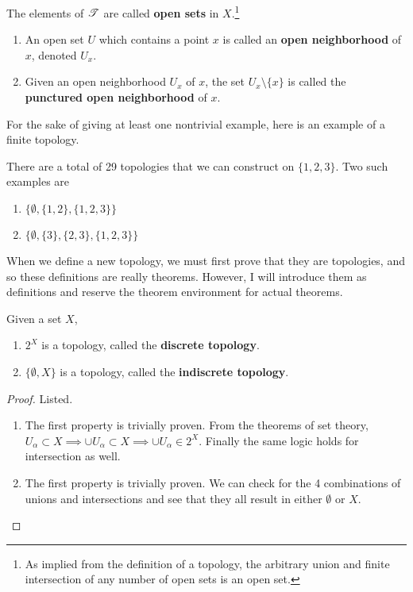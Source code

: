  \begin{definition}
    The elements of $\operatorname{\mathscr{T}}$ are called \textbf{open sets} in $X$.\footnote{As implied from the definition of a topology, the arbitrary union and finite intersection of any number of open sets is an open set.} 
    \begin{enumerate}
      \item An open set $U$ which contains a point $x$ is called an \textbf{open neighborhood} of $x$, denoted $U_x$. 
      \item Given an open neighborhood $U_x$ of $x$, the set $U_x \setminus \{x\}$ is called the \textbf{punctured open neighborhood} of $x$. 
    \end{enumerate}
  \end{definition}

  For the sake of giving at least one nontrivial example, here is an example of a finite topology. 

  \begin{example}
    There are a total of 29 topologies that we can construct on $\{1, 2, 3\}$. Two such examples are 
    \begin{enumerate}
      \item $\{\emptyset, \{1, 2\}, \{1, 2, 3\}\}$ 
      \item $\{\emptyset, \{3\}, \{2, 3\}, \{1, 2, 3\}\}$
    \end{enumerate}
  \end{example} 

  When we define a new topology, we must first prove that they are topologies, and so these definitions are really theorems. However, I will introduce them as definitions and reserve the theorem environment for actual theorems. 

  \begin{definition}
    Given a set $X$, 
    \begin{enumerate}
      \item $2^X$ is a topology, called the \textbf{discrete topology}. 
      \item $\{\emptyset, X \}$ is a topology, called the \textbf{indiscrete topology}. 
    \end{enumerate}
  \end{definition}
  \begin{proof}
    Listed. 
    \begin{enumerate}
      \item The first property is trivially proven. From the theorems of set theory, $U_\alpha \subset X \implies \cup U_\alpha \subset X \implies \cup U_\alpha \in 2^X$. Finally the same logic holds for intersection as well. 
      \item The first property is trivially proven. We can check for the 4 combinations of unions and intersections and see that they all result in either $\emptyset$ or $X$. 
    \end{enumerate}
  \end{proof}

